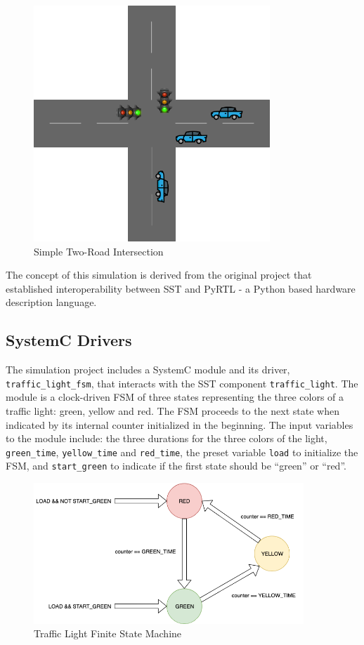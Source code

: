 \documentclass{article}
\begin{document}
  \begin{figure}[!h]
    \centering
    \includegraphics[width=3.5in]{diagrams/intersection.png}
    \caption{Simple Two-Road Intersection}
    \label{fig:intersection}
  \end{figure}

  The concept of this simulation is derived from the original project that established
  interoperability between SST and PyRTL - a Python based hardware description
  language.\cite{pyrtl-sst}

    \subsection{SystemC Drivers}
    The simulation project includes a SystemC module and its driver, \lstinline{traffic_light_fsm},
    that interacts with the SST component \lstinline{traffic_light}. The module is a clock-driven
    FSM of three states representing the three colors of a traffic light: green, yellow and red. The
    FSM proceeds to the next state when indicated by its internal counter initialized in the
    beginning. The input variables to the module include: the three durations for the three colors
    of the light, \lstinline{green_time}, \lstinline{yellow_time} and \lstinline{red_time}, the
    preset variable \lstinline{load} to initialize the FSM, and \lstinline{start_green} to indicate
    if the first state should be ``green'' or ``red''.

    \begin{figure}[!h]
      \centering
      \includegraphics[width=4in]{diagrams/fsm.png}
      \caption{Traffic Light Finite State Machine}
      \label{fig:fsm}
    \end{figure}
\end{document}
